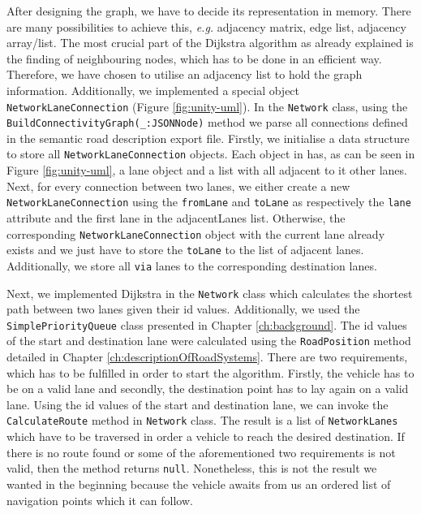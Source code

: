 After designing the graph, we have to decide its representation in memory. There are many possibilities to achieve this, \emph{e.g.} adjacency matrix, edge list, adjacency array/list. The most crucial part of the Dijkstra algorithm as already explained is the finding of neighbouring nodes, which has to be done in an efficient way. Therefore, we have chosen to utilise an adjacency list to hold the graph information. Additionally, we implemented a special object \texttt{NetworkLaneConnection} (Figure \ref{fig:unity-uml}). In the \texttt{Network} class, using the \texttt{BuildConnectivityGraph(\_:\;JSONNode)} method we parse all connections defined in the semantic road description export file. Firstly, we initialise a data structure to store all \texttt{NetworkLaneConnection} objects. Each object in has, as can be seen in Figure \ref{fig:unity-uml}, a lane object and a list with all adjacent to it other lanes. Next, for every connection between two lanes, we either create a new \texttt{NetworkLaneConnection} using the \texttt{fromLane} and \texttt{toLane} as respectively the \texttt{lane} attribute and the first lane in the adjacentLanes list. Otherwise, the corresponding \texttt{NetworkLaneConnection} object with the current lane already exists and we just have to store the \texttt{toLane} to the list of adjacent lanes. Additionally, we store all \texttt{via} lanes to the corresponding destination lanes.

Next, we implemented Dijkstra in the \texttt{Network} class which calculates the shortest path between two lanes given their id values. Additionally, we used the \texttt{SimplePriorityQueue} class presented in Chapter \ref{ch:background}. The id values of the start and destination lane were calculated using the \texttt{RoadPosition} method detailed in Chapter \ref{ch:descriptionOfRoadSystems}. There are two requirements, which has to be fulfilled in order to start the algorithm. Firstly, the vehicle has to be on a valid lane and secondly, the destination point has to lay again on a valid lane. Using the id values of the start and destination lane, we can invoke the \texttt{CalculateRoute} method in \texttt{Network} class. The result is a list of \texttt{NetworkLanes} which have to be traversed in order a vehicle to reach the desired destination. If there is no route found or some of the aforementioned two requirements is not valid, then the method returns \texttt{null}. Nonetheless, this is not the result we wanted in the beginning because the vehicle awaits from us an ordered list of navigation points which it can follow.\\

